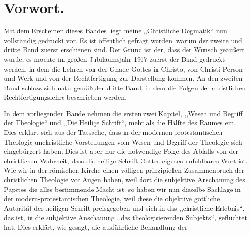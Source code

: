 \section*{Vorwort.}

Mit dem Erscheinen dieses Bandes liegt meine ,,Christliche Dogmatik`` nun vollständig gedruckt vor. Es ist öffentlich gefragt worden, warum der zweite und dritte Band zuerst erschienen sind. Der Grund ist der, dass der Wunsch geäußert wurde, es möchte im großen Jubiläumsjahr 1917 zuerst der Band gedruckt werden, in dem die Lehren von der Gnade Gottes in Christo, von Christi Person und Werk und von der Rechtfertigung zur Darstellung kommen. An den zweiten Band schloss sich naturgemäß der dritte Band, in dem die Folgen der christlichen Rechtfertigungslehre beschrieben werden.

In dem vorliegenden Bande nehmen die ersten zwei Kapitel, ,,Wesen und Begriff der Theologie`` und ,,Die Heilige Schrift``, mehr als die Hälfte des Raumes ein. Dies erklärt sich aus der Tatsache, dass in der modernen protestantischen Theologie unchristliche Vorstellungen vom Wesen und Begriff der Theologie sich eingebürgert haben. Dies ist aber nur die notwendige Folge des Abfalls von der christlichen Wahrheit, dass die heilige Schrift Gottes eigenes unfehlbares Wort ist. Wie wir in der römischen Kirche einen völligen prinzipiellen Zusammenbruch der christlichen Theologie vor Augen haben, weil dort die subjektive Anschauung des Papstes die alles bestimmende Macht ist, so haben wir nun dieselbe Sachlage in der modern-protestantischen Theologie, weil diese die objektive göttliche Autorität der heiligen Schrift preisgegeben und sich in das ,,christliche Erlebnis``, das ist, in die subjektive Anschauung ,,des theologisierenden Subjekts``, geflüchtet hat. Dies erklärt, wie gesagt, die ausführliche Behandlung der